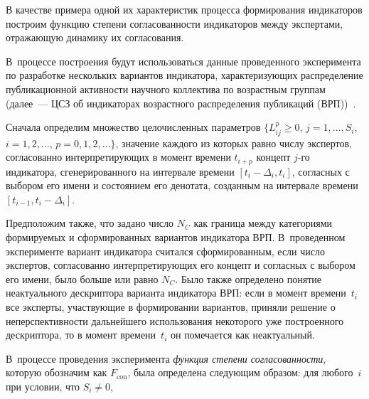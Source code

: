 \begin{multicols}{2}
   В качестве примера одной их характеристик процесса формирования индикаторов 
построим функцию степени согласованности индикаторов между экспертами, отражающую 
динамику их согласования. 

В~процессе построения будут использоваться данные 
проведенного эксперимента по разработке нескольких вариантов индикатора, 
характеризующих распределение публикационной активности научного коллектива по 
возрастным группам (далее~--- ЦСЗ об индикаторах возрастного распределения публикаций 
(ВРП))~\cite{8-zat}.
   
   Сначала определим множество целочисленных параметров $\{L^p_{ij}\geq0$, $j=1, \ldots , 
S_i$, $i = 1, 2,  \ldots$, $p= 0, 1, 2,  \ldots\}$, значение каждого из которых равно числу 
экспертов, согласованно интерпретирующих в момент времени $t_{i+p}$ концепт $j$-го 
индикатора, сгенерированного на интервале времени $[t_i -\Delta_i, t_i]$, согласных с 
выбором его имени и состоянием его денотата, созданным на интервале времени $[t_{i-1}, t_i -
\Delta_i]$.
   
   Предположим также, что задано число $N_C$ как\linebreak
   граница между категориями 
формируемых и сформированных вариантов индикатора ВРП. В~проведенном эксперименте 
вариант индикатора считался сформированным, если число экспертов, согласо\-ванно 
интерпретирующих его концепт и согласных с выбором его имени, было больше или равно 
$N_C$.\linebreak
 Было также определено понятие неактуального дескриптора варианта индикатора 
ВРП: если в момент времени~$t_i$ все эксперты, участ\-ву\-ющие в\linebreak
 формировании вариантов, 
приняли решение о неперспективности дальнейшего использования некоторого уже 
построенного дескриптора, то в момент времени~$t_i$ он помечается как неактуальный. 

В~процессе проведения эксперимента \textit{функция степени согласованности}, которую 
обозначим как $F_{\mathrm{con}}$, была определена следующим образом: для любого~$i$ при 
условии, что $S_i\not=0$, 


\end{multicols}
